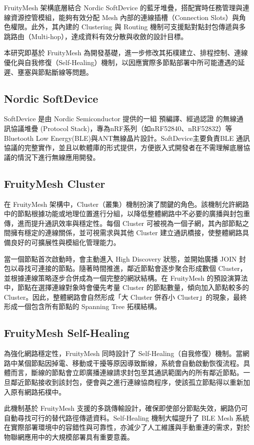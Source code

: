 \begin{ZhChapter}
FruityMesh 架構底層結合 Nordic SoftDevice 的藍牙堆疊，搭配實時任務管理與連線資源控管模組，能夠有效分配 Mesh 內部的連線插槽（Connection Slots）與角色權限。此外，其內建的 Clustering 與 Routing 機制可支援點對點封包傳遞與多跳路由（Multi-hop），達成資料有效分散與收斂的設計目標。

本研究即基於 FruityMesh 為開發基礎，進一步修改其拓樸建立、排程控制、連線優化與自我修復（Self-Healing）機制，以因應實際多節點部署中所可能遭遇的延遲、壅塞與節點斷線等問題。

\subsection{Nordic SoftDevice}
SoftDevice 是由 Nordic Semiconductor \cite{nordic2023softdevices} 提供的一組 預編譯、經過認證 的無線通訊協議堆疊 (Protocol Stack)，專為nRF系列（如nRF52840、nRF52832）等Bluetooth Low Energy(BLE)與ANT無線晶片設計。SoftDevice主要負責BLE 通訊協議的完整實作，並且以軟體庫的形式提供，方便嵌入式開發者在不需理解底層協議的情況下進行無線應用開發。

\subsection{FruityMesh Cluster}
在 FruityMesh \cite{fruitymesh2023} 架構中，Cluster（叢集）機制扮演了關鍵的角色。該機制允許網路中的節點根據功能或地理位置進行分組，以降低整體網路中不必要的廣播與封包重傳，進而提升通訊效率與穩定性。每個 Cluster 可被視為一個子網，其內部節點之間擁有穩定的連線關係，並可視需求與其他 Cluster 建立通訊橋接，使整體網路具備良好的可擴展性與模組化管理能力。

當一個節點首次啟動時，會主動進入 High Discovery 狀態，並開始廣播 JOIN 封包以尋找可連接的節點。隨著時間推進，鄰近節點會逐步聚合形成數個 Cluster，並根據連線策略逐步合併成為一個完整的網狀結構。在 FruityMesh 的預設演算法中，節點在選擇連線對象時會優先考量 Cluster 的節點數量，傾向加入節點較多的 Cluster。因此，整體網路會自然形成「大 Cluster 併吞小 Cluster」的現象，最終形成一個包含所有節點的 Spanning Tree 拓樸結構。

\subsection{FruityMesh Self-Healing}
為強化網路穩定性，FruityMesh \cite{fruitymesh2023} 同時設計了 Self-Healing（自我修復）機制。當網路中某個節點因掉電、移動或干擾等原因導致斷線，系統會自動啟動恢復流程。具體而言，斷線的節點會立即廣播連線請求封包至其通訊範圍內的所有鄰近節點。一旦鄰近節點接收到該封包，便會與之進行連線協商程序，使該孤立節點得以重新加入原有網路拓樸中。

此機制基於 FruityMesh 支援的多跳傳輸設計，確保即使部分節點失效，網路仍可自動尋找可行的替代路徑傳遞資料。Self-Healing 機制大幅提升了 BLE Mesh 系統在實際部署環境中的容錯性與可靠性，亦減少了人工維護與手動重連的需求，對於物聯網應用中的大規模部署具有重要意義。

\end{ZhChapter}